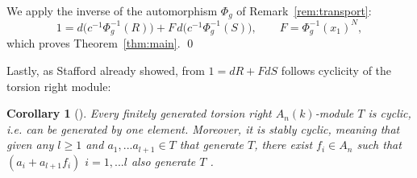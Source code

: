\documentclass[pdflatex,sn-mathphys-num]{sn-jnl}
\numberwithin{equation}{section}
\theoremstyle{thmstyleone}
\newtheorem{corollary}[theorem]{Corollary}
\theoremstyle{thmstyletwo}
\begin{document}
We apply the inverse of the automorphism $\Phi_g$ of
Remark~\ref{rem:transport}:
\[
 1=d\bigl(c^{-1}\Phi_g^{-1}(R)\bigr)+F\,d\bigl(c^{-1}\Phi_g^{-1}(S)\bigr),
 \qquad F=\Phi_g^{-1}(x_1)^N,
\]
which proves Theorem~\ref{thm:main}. \qed





Lastly, as Stafford already showed, from $1 = dR+FdS$ follows cyclicity of the torsion right module:
\begin{corollary}[\cite{Stafford1978}]\label{cor:cyclic}
Every finitely generated torsion right $A_n(k)$-module $T$ is cyclic, i.e. can be generated by one element. Moreover, it is stably cyclic, meaning that given any $l\geq 1$ and $a_1,...a_{l+1} \in T$ that generate $T$, there exist $f_i \in A_n$ such that $(a_i + a_{l+1}f_i)$ $i = 1,...l$ also generate $T$ \cite[p. 435]{Stafford1978}. 
\end{corollary}
\end{document}

